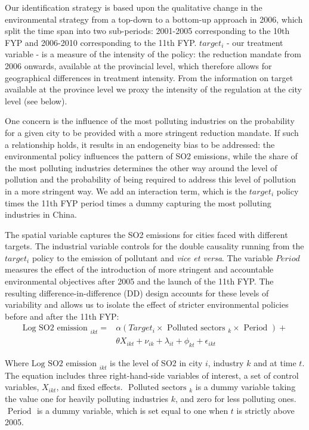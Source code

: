 \documentclass[12pt]{article}
\begin{document}
Our identification strategy is based upon the qualitative change in the environmental strategy from a top-down to a bottom-up approach in 2006, which split the time span into two sub-periods: 2001-2005 corresponding to the 10th FYP and 2006-2010 corresponding to the 11th FYP. $target_i$ - our treatment variable - is a measure of the intensity of the policy: the reduction mandate from 2006 onwards, available at the provincial level, which therefore allows for geographical differences in treatment intensity. From the information on target available at the province level we proxy the intensity of the regulation at the city level (see below). 


One concern is the influence of the most polluting industries on the probability for a given city to be provided with a more stringent reduction mandate. If such a relationship holds, it results in an endogeneity bias to be addressed: the environmental policy influences the pattern of SO2 emissions, while the share of the most polluting industries determines the other way around the level of pollution and the probability of being required to address this level of pollution in a more stringent way. We add an interaction term, which is the $target_i$ policy times the 11th FYP period times a dummy capturing the most polluting industries in China. 


The spatial variable captures the SO2 emissions for cities faced with different targets. The industrial variable controls for the double causality running from the $target_i$ policy to the emission of pollutant and \textit{vice et versa}. The variable $Period$ measures the effect of the introduction of more stringent and accountable environmental objectives after 2005 and the launch of the 11th FYP. The resulting difference-in-difference (DD) design accounts for these levels of variability and allows us to isolate the effect of stricter environmental policies before and after the 11th FYP: 
\begin{equation} \label{eq:equation_1}
\begin{aligned} 
\text {Log SO2 emission }_{i k t}= & \alpha (Target_{i} \times \text { Polluted sectors }_{k} \times \text { Period }) + \\ 
& \theta {X}_{i k t}+\nu_{ik}+\lambda_{it} +\phi_{kt} +\epsilon_{ikt}
\end{aligned}
\end{equation}

Where $\text {Log SO2 emission }_{i k t}$ is the level of SO2 in city $i$, industry $k$ and at time $t$. The equation includes three right-hand-side variables of interest, a set of control variables, ${X}_{i k t}$, and fixed effects. $\text { Polluted sectors }_{k}$ is a dummy variable taking the value one for heavily polluting industries $k$, and zero for less polluting ones. $\text { Period }$ is a dummy variable, which is set equal to one when $t$ is strictly above 2005. 
\end{document}
